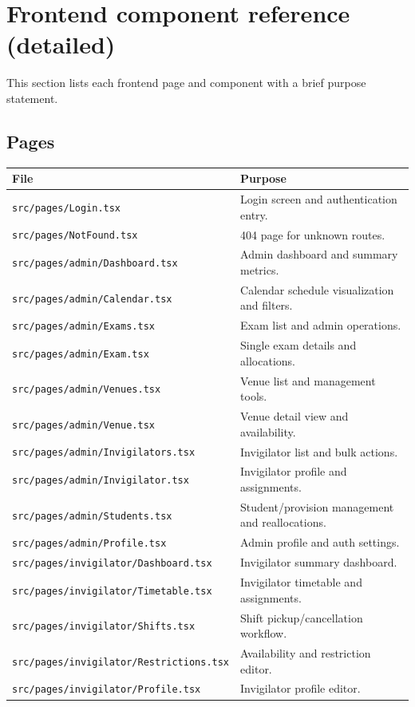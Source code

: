 \section{Frontend component reference (detailed)}
\label{sec:frontend:components:detail}

This section lists each frontend page and component with a brief purpose statement.

\subsection{Pages}
\label{subsec:frontend:components:detail:pages}

\begin{longtable}{p{}p{}}
\toprule
\textbf{File} & \textbf{Purpose} \\
\midrule
\texttt{src/pages/Login.tsx} & Login screen and authentication entry. \\
\texttt{src/pages/NotFound.tsx} & 404 page for unknown routes. \\
\texttt{src/pages/admin/Dashboard.tsx} & Admin dashboard and summary metrics. \\
\texttt{src/pages/admin/Calendar.tsx} & Calendar schedule visualization and filters. \\
\texttt{src/pages/admin/Exams.tsx} & Exam list and admin operations. \\
\texttt{src/pages/admin/Exam.tsx} & Single exam details and allocations. \\
\texttt{src/pages/admin/Venues.tsx} & Venue list and management tools. \\
\texttt{src/pages/admin/Venue.tsx} & Venue detail view and availability. \\
\texttt{src/pages/admin/Invigilators.tsx} & Invigilator list and bulk actions. \\
\texttt{src/pages/admin/Invigilator.tsx} & Invigilator profile and assignments. \\
\texttt{src/pages/admin/Students.tsx} & Student/provision management and reallocations. \\
\texttt{src/pages/admin/Profile.tsx} & Admin profile and auth settings. \\
\texttt{src/pages/invigilator/Dashboard.tsx} & Invigilator summary dashboard. \\
\texttt{src/pages/invigilator/Timetable.tsx} & Invigilator timetable and assignments. \\
\texttt{src/pages/invigilator/Shifts.tsx} & Shift pickup/cancellation workflow. \\
\texttt{src/pages/invigilator/Restrictions.tsx} & Availability and restriction editor. \\
\texttt{src/pages/invigilator/Profile.tsx} & Invigilator profile editor. \\
\bottomrule
\end{longtable}

